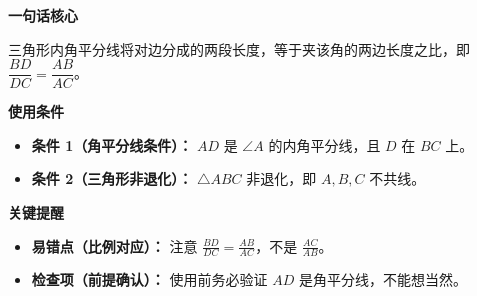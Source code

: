 \begin{summarybox}
	\textbf{\textcolor{CSummary}{一句话核心}}

	三角形内角平分线将对边分成的两段长度，等于夹该角的两边长度之比，即 $\dfrac{BD}{DC}=\dfrac{AB}{AC}$。

	\medskip
	\textbf{\textcolor{CSummary}{使用条件}}
	\begin{itemize}[leftmargin=*, itemsep=0.5em, topsep=0.4em]
		\item \textbf{条件 1（角平分线条件）：} $AD$ 是 $\angle A$ 的内角平分线，且 $D$ 在 $BC$ 上。
		\item \textbf{条件 2（三角形非退化）：} $\triangle ABC$ 非退化，即 $A,B,C$ 不共线。
	\end{itemize}

	\medskip
	\textbf{\textcolor{CSummary}{关键提醒}}
	\begin{itemize}[leftmargin=*, itemsep=0.5em, topsep=0.4em]
		\item \textbf{易错点（比例对应）：} 注意 $\frac{BD}{DC}=\frac{AB}{AC}$，不是 $\frac{AC}{AB}$。
		\item \textbf{检查项（前提确认）：} 使用前务必验证 $AD$ 是角平分线，不能想当然。
	\end{itemize}
\end{summarybox}
